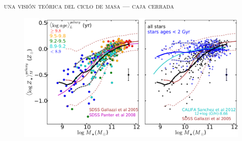 \documentclass[xcolor=dvipsnames,4pt,hyperref={colorlinks,citecolor=black,linkcolor=black,urlcolor=black}]{beamer}
\begin{document}
\begin{frame}{\textsc{una visión teórica del ciclo de masa --- caja cerrada}}

\begin{figure}
\includegraphics[scale=1]{img/gonzalez2014b-1}
\end{figure}

\end{frame}
\end{document}
